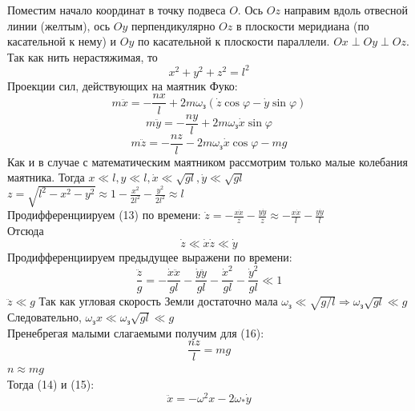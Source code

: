 Поместим начало координат в точку подвеса $O$. Ось $Oz$ направим вдоль отвесной линии (желтым), ось $Oy$ перпендикулярно $Oz$ в плоскости меридиана (по касательной к нему) и $Oy$ по касательной к плоскости параллели. $Ox \perp Oy \perp Oz$.\\
Так как нить нерастяжимая, то
\begin{equation}
x^2 + y^2 + z^2 = l^2
\end{equation}
Проекции сил, действующих на маятник Фуко:
\begin{equation}
m\ddot{x} = -\frac{nx}{l} + 2m\omega_{з} (\dot{z}\cos\varphi - \dot{y}\sin\varphi)
\end{equation}
\begin{equation}
m\ddot{y} = -\frac{ny}{l} + 2m\omega_{з}\dot{x}\sin\varphi
\end{equation}
\begin{equation}
m\ddot{z} = -\frac{nz}{l} - 2m\omega_{з}\dot{x}\cos\varphi - mg
\end{equation}
Как и в случае с математическим маятником рассмотрим только малые колебания маятника.
Тогда $x \ll l, y \ll l,  \dot{x} \ll \sqrt{gl},  \dot{y} \ll \sqrt{gl}$\\
$z = \sqrt{l^2 - x^2 - y^2} \approx 1 - \frac{x^2}{2l^2} - \frac{y^2}{2l^2} \approx l $ \\
Продифференциируем (13) по времени:
$\dot{z} = - \frac{x\dot{x}}{z} - \frac{y\dot{y}}{z} \approx   - \frac{x\dot{x}}{l} - \frac{y\dot{y}}{l} $  \\
Отсюда 
\begin{equation} \dot{z} \ll \dot{x} \dot{z} \ll \dot{y}  \end{equation}
Продифференциируем предыдущее выражени по времени:
\begin{equation} \frac{\ddot{z}}{g} = - \frac{\dot{x}\ddot{x}}{gl}  - \frac{\dot{y}\ddot{y}}{gl}  - \frac{\dot{x}^2}{gl}  - \frac{\dot{y}^2}{gl} \ll 1 \end{equation}
$\ddot{z} \ll g$
Так как угловая скорость Земли достаточно мала $\omega_{з} \ll \sqrt{g/l}  \Rightarrow  \omega_{з}\sqrt{gl} \ll g $ \\
Следовательно, $\omega_{з}x \ll  \omega_{з}\sqrt{gl} \ll  g $\\
Пренебрегая малыми слагаемыми получим для (16):
\begin{equation}
\frac{nz}{l} = mg
\end{equation}
$n \approx mg$\\
Тогда (14) и (15):
\begin{equation}
\ddot{x} = - \omega^{2}x - 2\omega_{*}\dot{y}
\end{equation}

